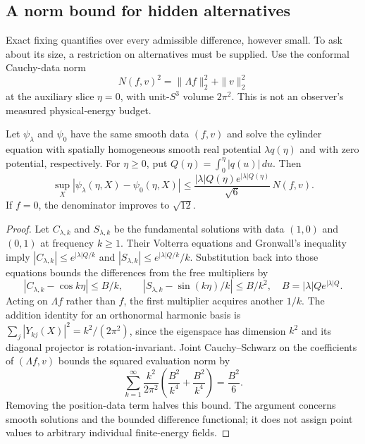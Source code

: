\subsection{A norm bound for hidden alternatives}

Exact fixing quantifies over every admissible difference, however small.
To ask about its size, a restriction on alternatives must be supplied. Use
the conformal Cauchy-data norm
\[
 N(f,v)^2=\|\Lambda f\|_2^2+\|v\|_2^2
\]
at the auxiliary slice $\eta=0$, with unit-$S^3$ volume $2\pi^2$.
This is not an observer's measured physical-energy budget.

\begin{proposition}\label{prop:norm}
Let $\psi_\lambda$ and $\psi_0$ have the same smooth data $(f,v)$ and solve
the cylinder equation with spatially homogeneous smooth real potential
$\lambda q(\eta)$ and with zero potential, respectively. For $\eta\ge0$, put
$Q(\eta)=\int_0^\eta |q(u)|\,du$. Then
\begin{equation}\label{eq:norm}
 \sup_X|\psi_\lambda(\eta,X)-\psi_0(\eta,X)|
 \le \frac{|\lambda|Q(\eta)e^{|\lambda|Q(\eta)}}{\sqrt6}\,N(f,v).
\end{equation}
If $f=0$, the denominator improves to $\sqrt{12}$.
\end{proposition}

\begin{proof}
Let $C_{\lambda,k}$ and $S_{\lambda,k}$ be the fundamental solutions with
data $(1,0)$ and $(0,1)$ at frequency $k\ge1$. Their Volterra equations and
Gronwall's inequality imply
$|C_{\lambda,k}|\le e^{|\lambda|Q/k}$ and
$|S_{\lambda,k}|\le e^{|\lambda|Q/k}/k$. Substitution back into those
equations bounds the differences from the free multipliers by
\[
 |C_{\lambda,k}-\cos k\eta|\le B/k,\qquad
 |S_{\lambda,k}-\sin(k\eta)/k|\le B/k^2,
 \quad B=|\lambda|Qe^{|\lambda|Q}.
\]
Acting on $\Lambda f$ rather than $f$, the first multiplier acquires another
$1/k$. The addition identity for an orthonormal harmonic basis is
$\sum_j|Y_{kj}(X)|^2=k^2/(2\pi^2)$, since the eigenspace has dimension
$k^2$ and its diagonal projector is rotation-invariant. Joint
Cauchy--Schwarz on the coefficients of $(\Lambda f,v)$ bounds the squared
evaluation norm by
\[
 \sum_{k=1}^\infty\frac{k^2}{2\pi^2}
       \left(\frac{B^2}{k^4}+\frac{B^2}{k^4}\right)
 =\frac{B^2}{6}.
\]
Removing the position-data term halves this bound. The argument concerns
smooth solutions and the bounded difference functional; it does not assign
point values to arbitrary individual finite-energy fields.
\end{proof}

